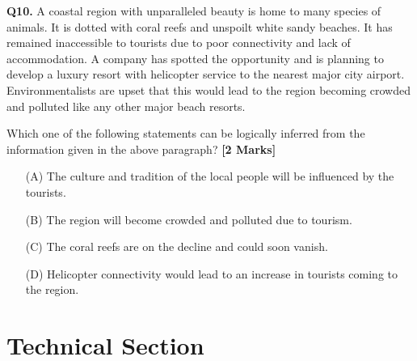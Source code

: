 \documentclass[11pt]{article}
\newcommand{\questionb}[2]{
    \noindent\textbf{Q#2.} #1 \hfill \textbf{[2 Marks]}
}
\begin{document}
\vspace{0.5cm}

\questionb{A coastal region with unparalleled beauty is home to many species of animals. It is dotted with coral reefs and unspoilt white sandy beaches. It has remained inaccessible to tourists due to poor connectivity and lack of accommodation. A company has spotted the opportunity and is planning to develop a luxury resort with helicopter service to the nearest major city airport. Environmentalists are upset that this would lead to the region becoming crowded and polluted like any other major beach resorts.

Which one of the following statements can be logically inferred from the information given in the above paragraph?}{10}
\begin{enumerate}
    \item[(A)] The culture and tradition of the local people will be influenced by the tourists.
    \item[(B)] The region will become crowded and polluted due to tourism.
    \item[(C)] The coral reefs are on the decline and could soon vanish.
    \item[(D)] Helicopter connectivity would lead to an increase in tourists coming to the region.
\end{enumerate}

\vspace{0.5cm}

\section*{Technical Section}
\end{document}
